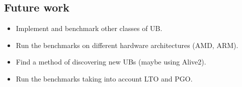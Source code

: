 \documentclass{sciposter}
\begin{document}
\begin{multicols}{3}
\section{Future work}
\begin{itemize}
\item Implement and benchmark other classes of UB.
\item Run the benchmarks on different hardware architectures (AMD, ARM).
\item Find a method of discovering new UBs (maybe using Alive2).
\item Run the benchmarks taking into account LTO and PGO.
\end{itemize}


\end{multicols}
\end{document}
